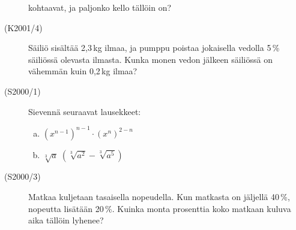 \begin{description}
                        kohtaavat, ja paljonko kello tällöin on? 
    \item[(K2001/4)]   Säiliö sisältää 2,3\,kg ilmaa, ja pumppu poistaa jokaisella
                        vedolla 5\,\% säiliössä olevasta ilmasta. Kunka monen vedon
                        jälkeen säiliössä on vähemmän kuin 0,2\,kg ilmaa?
    \item[(S2000/1)]   Sievennä seuraavat lausekkeet:
                        \begin{enumerate}[(a)]
                            \item $ \left( x^{n - 1} \right)^{n - 1} \cdot
                                \left( x^{n} \right)^{2 - n} $
                            \item $ \sqrt[3]{a} \; ( \sqrt[3]{a^2} - \sqrt[3]{a^5}) $
                        \end{enumerate}
    \item[(S2000/3)]   Matkaa kuljetaan tasaisella nopeudella. Kun matkasta on
                        jäljellä 40\,\%, nopeutta lisätään 20\,\%. Kuinka monta
                        prosenttia koko matkaan kuluva aika tällöin lyhenee?

\end{description}
